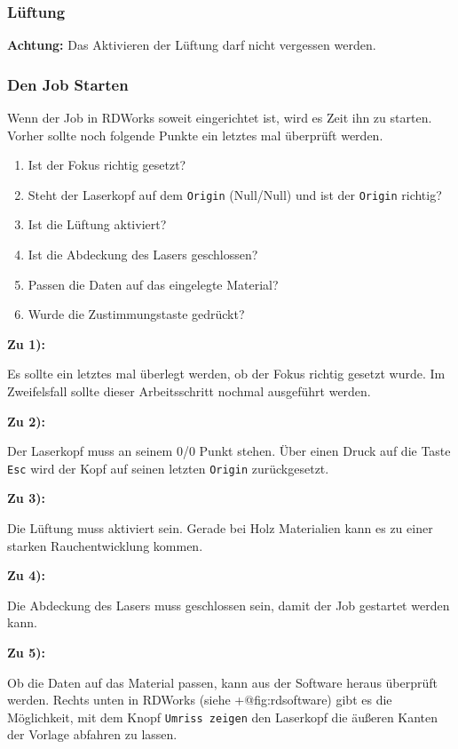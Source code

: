 \documentclass[]{article}
\providecommand{\tightlist}{%
  \setlength{\itemsep}{0pt}\setlength{\parskip}{0pt}}
\begin{document}
\hypertarget{luxfcftung}{%
\subsubsection{Lüftung}\label{luxfcftung}}

\textbf{Achtung:} Das Aktivieren der Lüftung darf nicht vergessen
werden.

\hypertarget{den-job-starten}{%
\subsubsection{Den Job Starten}\label{den-job-starten}}

Wenn der Job in RDWorks soweit eingerichtet ist, wird es Zeit ihn zu
starten. Vorher sollte noch folgende Punkte ein letztes mal überprüft
werden.

\begin{enumerate}
\def\labelenumi{\arabic{enumi}.}
\tightlist
\item
  Ist der Fokus richtig gesetzt?
\item
  Steht der Laserkopf auf dem \texttt{Origin} (Null/Null) und ist der
  \texttt{Origin} richtig?
\item
  Ist die Lüftung aktiviert?
\item
  Ist die Abdeckung des Lasers geschlossen?
\item
  Passen die Daten auf das eingelegte Material?
\item
  Wurde die Zustimmungstaste gedrückt?
\end{enumerate}

\textbf{Zu 1):}

Es sollte ein letztes mal überlegt werden, ob der Fokus richtig gesetzt
wurde. Im Zweifelsfall sollte dieser Arbeitsschritt nochmal ausgeführt
werden.

\textbf{Zu 2):}

Der Laserkopf muss an seinem 0/0 Punkt stehen. Über einen Druck auf die
Taste \texttt{Esc} wird der Kopf auf seinen letzten \texttt{Origin}
zurückgesetzt.

\textbf{Zu 3):}

Die Lüftung muss aktiviert sein. Gerade bei Holz Materialien kann es zu
einer starken Rauchentwicklung kommen.

\textbf{Zu 4):}

Die Abdeckung des Lasers muss geschlossen sein, damit der Job gestartet
werden kann.

\textbf{Zu 5):}

Ob die Daten auf das Material passen, kann aus der Software heraus
überprüft werden. Rechts unten in RDWorks (siehe +@fig:rdsoftware) gibt
es die Möglichkeit, mit dem Knopf \texttt{Umriss\ zeigen} den Laserkopf
die äußeren Kanten der Vorlage abfahren zu lassen.
\end{document}
